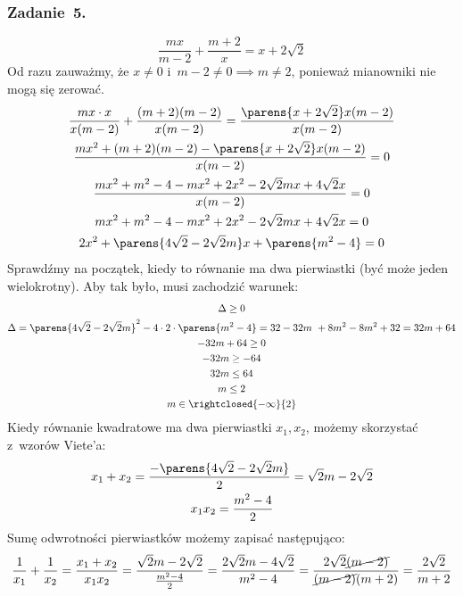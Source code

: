 \subsubsection*{Zadanie~5.}
\begin{equation*}
    \frac{mx}{m - 2} + \frac{m + 2}{x} = x + 2\sqrt{2}
\end{equation*}
Od razu zauważmy, że \(x \neq 0\) i~\(m - 2 \neq 0 \implies m \neq 2\), ponieważ mianowniki nie mogą się zerować.
\begin{gather*}
    \frac{mx \cdot x}{x(m - 2)} + \frac{(m + 2)(m - 2)}{x(m - 2)} = \frac{\parens{x + 2\sqrt{2}}x(m - 2)}{x(m - 2)}\\
    \frac{mx^2 + (m + 2)(m - 2) - \parens{x + 2\sqrt{2}}x(m - 2)}{x(m - 2)} = 0\\
    \frac{mx^2 + m^2 - 4 - mx^2 + 2x^2 - 2\sqrt{2}mx + 4\sqrt{2}x}{x(m - 2)} = 0\\
    mx^2 + m^2 - 4 - mx^2 + 2x^2 - 2\sqrt{2}mx + 4\sqrt{2}x = 0\\
    2x^2 + \parens{4\sqrt{2} - 2\sqrt{2}m}x + \parens{m^2 - 4} = 0
\end{gather*}
Sprawdźmy na początek, kiedy to równanie ma dwa pierwiastki (być może jeden wielokrotny). Aby tak było, musi zachodzić warunek:
\begin{gather*}
    \Delta \geq 0\\
    \Delta
        = \parens{4\sqrt{2} - 2\sqrt{2}m}^2 - 4 \cdot 2 \cdot \parens{m^2 - 4}
        = 32 - 32m + 8m^2 - 8m^2 + 32
        = 32m + 64\\
    -32m + 64 \geq 0\\
    -32m \geq -64\\
    32m \leq 64\\
    m \leq 2\\
    m \in \rightclosed{-\infty}{2}
\end{gather*}
Kiedy równanie kwadratowe ma dwa pierwiastki \(x_1, x_2\), możemy skorzystać z~wzorów Viete'a:
\begin{gather*}
    x_1 + x_2 = \frac{-\parens{4\sqrt{2} - 2\sqrt{2}m}}{2} = \sqrt{2}m - 2\sqrt{2}\\
    x_1x_2 = \frac{m^2 - 4}{2}
\end{gather*}
Sumę odwrotności pierwiastków możemy zapisać następująco:
\begin{equation*}
    \frac{1}{x_1} + \frac{1}{x_2}
        = \frac{x_1 + x_2}{x_1x_2}
        = \frac{\sqrt{2}m - 2\sqrt{2}}{\frac{m^2 - 4}{2}}
        = \frac{2\sqrt{2}m - 4\sqrt{2}}{m^2 - 4}
        = \frac{2\sqrt{2}\cancel{(m - 2)}}{\cancel{(m - 2)}(m + 2)}
        = \frac{2\sqrt{2}}{m + 2}
\end{equation*}
